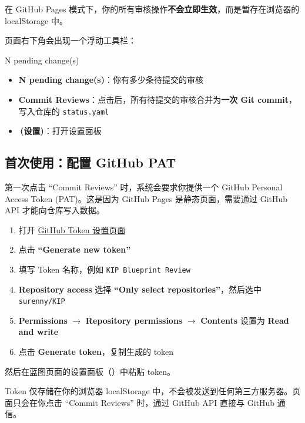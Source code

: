 \documentclass[11pt,a4paper]{article}
\newcommand{\gearsymbol}{\raisebox{-0.5pt}{\scriptsize$\diamond$}}
\begin{document}
在 GitHub Pages 模式下，你的所有审核操作\textbf{不会立即生效}，而是暂存在浏览器的 localStorage 中。

页面右下角会出现一个浮动工具栏：

\begin{codebox}
\textnormal{N pending change(s)\quad \gearsymbol{}}
\end{codebox}

\begin{itemize}[nosep]
  \item \textbf{N pending change(s)}：你有多少条待提交的审核
  \item \textbf{Commit Reviews}：点击后，所有待提交的审核合并为\textbf{一次 Git commit}，写入仓库的 \texttt{status.yaml}
  \item \textbf{\gearsymbol{}\,(设置)}：打开设置面板
\end{itemize}

\subsection{首次使用：配置 GitHub PAT}

第一次点击 ``Commit Reviews'' 时，系统会要求你提供一个 GitHub Personal Access Token (PAT)。这是因为 GitHub Pages 是静态页面，需要通过 GitHub API 才能向仓库写入数据。

\begin{infobox}
\begin{enumerate}[nosep]
  \item 打开 \href{https://github.com/settings/tokens?type=beta}{GitHub Token 设置页面}
  \item 点击 \textbf{``Generate new token''}
  \item 填写 Token 名称，例如 \texttt{KIP Blueprint Review}
  \item \textbf{Repository access} 选择 \textbf{``Only select repositories''}，然后选中 \texttt{surenny/KIP}
  \item \textbf{Permissions} $\to$ \textbf{Repository permissions} $\to$ \textbf{Contents} 设置为 \textbf{Read and write}
  \item 点击 \textbf{Generate token}，复制生成的 token
\end{enumerate}
然后在蓝图页面的设置面板（\gearsymbol{}）中粘贴 token。
\end{infobox}

\begin{tipbox}[安全说明]
Token 仅存储在你的浏览器 localStorage 中，不会被发送到任何第三方服务器。页面只会在你点击 ``Commit Reviews'' 时，通过 GitHub API 直接与 GitHub 通信。
\end{tipbox}
\end{document}
